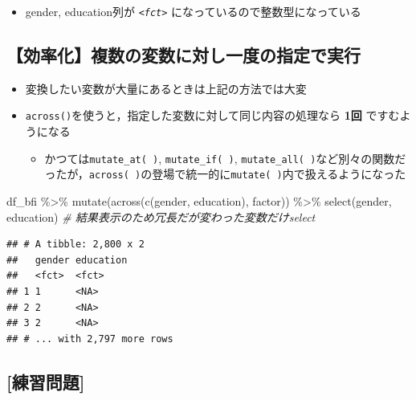 \documentclass[
  xelatex,ja=standard, b5paper]{bxjsbook}
\newenvironment{Shaded}{\begin{snugshade}}{\end{snugshade}}
\newcommand{\CommentTok}[1]{\textcolor[rgb]{0.56,0.35,0.01}{\textit{#1}}}
\newcommand{\FunctionTok}[1]{\textcolor[rgb]{0.00,0.00,0.00}{#1}}
\newcommand{\NormalTok}[1]{#1}
\newcommand{\SpecialCharTok}[1]{\textcolor[rgb]{0.00,0.00,0.00}{#1}}
\providecommand{\tightlist}{%
  \setlength{\itemsep}{0pt}\setlength{\parskip}{0pt}}
\begin{document}
\begin{itemize}
\tightlist
\item
  gender, education列が \emph{\texttt{\textless{}fct\textgreater{}}} になっているので整数型になっている
\end{itemize}

\hypertarget{mu-kata-across}{%
\subsection{【効率化】複数の変数に対し一度の指定で実行}\label{mu-kata-across}}

\begin{itemize}
\tightlist
\item
  変換したい変数が大量にあるときは上記の方法では大変
\item
  \texttt{across()}を使うと，指定した変数に対して同じ内容の処理なら \textbf{1回} ですむようになる

  \begin{itemize}
  \tightlist
  \item
    かつては\texttt{mutate\_at(\ )}, \texttt{mutate\_if(\ )}, \texttt{mutate\_all(\ )}など別々の関数だったが，\texttt{across(\ )}の登場で統一的に\texttt{mutate(\ )}内で扱えるようになった
  \end{itemize}
\end{itemize}

\begin{Shaded}
\begin{Highlighting}[]
\NormalTok{df\_bfi }\SpecialCharTok{\%\textgreater{}\%}
  \FunctionTok{mutate}\NormalTok{(}\FunctionTok{across}\NormalTok{(}\FunctionTok{c}\NormalTok{(gender, education),}
\NormalTok{                factor)) }\SpecialCharTok{\%\textgreater{}\%} 
  \FunctionTok{select}\NormalTok{(gender, education)   }\CommentTok{\# 結果表示のため冗長だが変わった変数だけselect}
\end{Highlighting}
\end{Shaded}

\begin{verbatim}
## # A tibble: 2,800 x 2
##   gender education
##   <fct>  <fct>    
## 1 1      <NA>     
## 2 2      <NA>     
## 3 2      <NA>     
## # ... with 2,797 more rows
\end{verbatim}

\hypertarget{ux7df4ux7fd2ux554fux984c-10}{%
\subsection{{[}練習問題{]}}\label{ux7df4ux7fd2ux554fux984c-10}}
\end{document}
